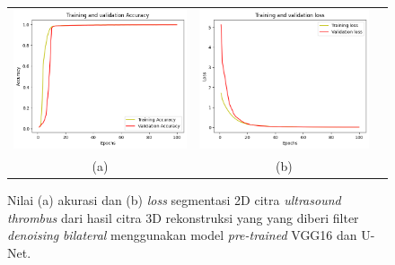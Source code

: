 \begin{enumerate}
	
	\begin{figure}[htbp]
		\centering
		\begin{tabular}{ccc}
			\includegraphics[scale=0.5]{bab4/Rekap Training/VGG16-UNet/bilateral/4/acc_99,64480996131897.png} &
			\includegraphics[scale=0.5]{bab4/Rekap Training/VGG16-UNet/bilateral/4/loss_0,0125.png} & \\
			(a) & (b)    %
		\end{tabular}
		\caption{Nilai (a) akurasi dan (b) \textit{loss} segmentasi 2D citra \textit{ultrasound} \textit{thrombus} dari hasil citra 3D rekonstruksi yang yang diberi filter \textit{denoising} \textit{bilateral} menggunakan model \textit{pre-trained} VGG16 dan U-Net.}
		\label{fig:performance-bilateral-vggunet-rekonstruksi}
	\end{figure}


\end{enumerate}

